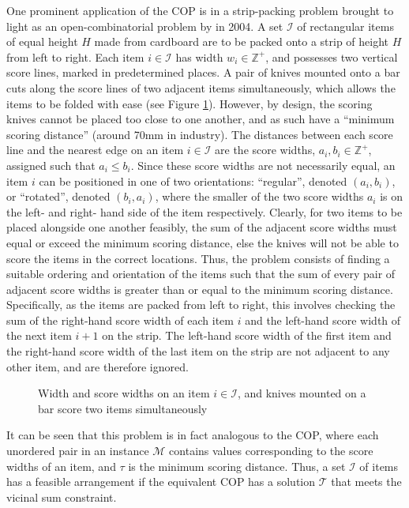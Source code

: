 \documentclass[oribibl]{llncs}
\begin{document}
One prominent application of the COP is in a strip-packing problem brought to light as an open-combinatorial problem by \citeauthor{goulimis2004} in 2004. A set $\mathcal{I}$ of rectangular items of equal height $H$ made from cardboard are to be packed onto a strip of height $H$ from left to right. Each item $i \in \mathcal{I}$ has width $w_i \in \mathbb{Z}^{+}$, and possesses two vertical score lines, marked in predetermined places. A pair of knives mounted onto a bar cuts along the score lines of two adjacent items simultaneously, which allows the items to be folded with ease (see Figure \ref{fig:boxknife}). However, by design, the scoring knives cannot be placed too close to one another, and as such have a ``minimum scoring distance'' (around 70mm in industry). The distances between each score line and the nearest edge on an item $i \in \mathcal{I}$ are the score widths, $a_i, b_i \in \mathbb{Z}^{+}$, assigned such that $a_i \leq b_i$. Since these score widths are not necessarily equal, an item $i$ can be positioned in one of two orientations: ``regular'', denoted $(a_i, b_i)$, or ``rotated'', denoted $(b_i, a_i)$, where the smaller of the two score widths $a_i$ is on the left- and right- hand side of the item respectively. Clearly, for two items to be placed alongside one another feasibly, the sum of the adjacent score widths must equal or exceed the minimum scoring distance, else the knives will not be able to score the items in the correct locations. Thus, the problem consists of finding a suitable ordering and orientation of the items such that the sum of every pair of adjacent score widths is greater than or equal to the minimum scoring distance. Specifically, as the items are packed from left to right, this involves checking the sum of the right-hand score width of each item $i$ and the left-hand score width of the next item $i+1$ on the strip. The left-hand score width of the first item and the right-hand score width of the last item on the strip are not adjacent to any other item, and are therefore ignored. 


\begin{figure}[h!]	
	\centering
	
	\caption{Width and score widths on an item $i \in \mathcal{I}$, and knives mounted on a bar score two items simultaneously}	
	\label{fig:boxknife}
\end{figure}


It can be seen that this problem is in fact analogous to the COP, where each unordered pair in an instance $\mathcal{M}$ contains values corresponding to the score widths of an item, and $\tau$ is the minimum scoring distance. Thus, a set $\mathcal{I}$ of items has a feasible arrangement if the equivalent COP has a solution $\mathcal{T}$ that meets the vicinal sum constraint.
\end{document}
